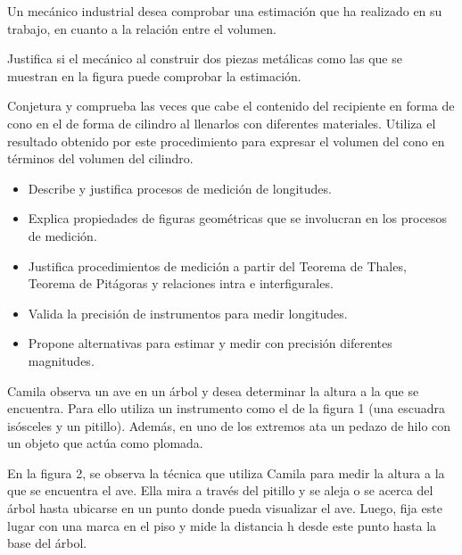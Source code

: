 \ejemplo

Un mecánico industrial desea comprobar una estimación que ha realizado en su trabajo, en cuanto a la relación entre el volumen.

Justifica si el mecánico al construir dos piezas metálicas como las que se muestran en la figura puede comprobar la estimación.


Conjetura y comprueba las veces que cabe el contenido del recipiente en forma de cono en el de forma de cilindro al llenarlos con diferentes materiales. Utiliza el resultado obtenido por este procedimiento para expresar el volumen del cono en términos del volumen del cilindro.


\evidencias

\begin{itemize}
  \item Describe y justifica procesos de medición de longitudes.
  \item Explica propiedades de figuras geométricas que se involucran en los procesos de medición.
  \item Justifica procedimientos de medición a partir del Teorema de Thales, Teorema de Pitágoras y relaciones intra e interfigurales.
  \item Valida la precisión de instrumentos para medir longitudes.
  \item Propone alternativas para estimar y medir con precisión diferentes magnitudes.
\end{itemize}

\ejemplo

Camila observa un ave en un árbol y desea determinar la altura a la que se encuentra. Para ello utiliza un instrumento como el de la figura 1 (una escuadra isósceles y un pitillo). Además, en uno de los extremos ata un pedazo de hilo con un objeto que actúa como plomada.


En la figura 2, se observa la técnica que utiliza Camila para medir la altura a la que se encuentra el ave. Ella mira a través del pitillo y se aleja o se acerca del árbol hasta ubicarse en un punto donde pueda visualizar el ave. Luego, fija este lugar con una marca en el piso y mide la distancia h desde este punto hasta la base del árbol.

